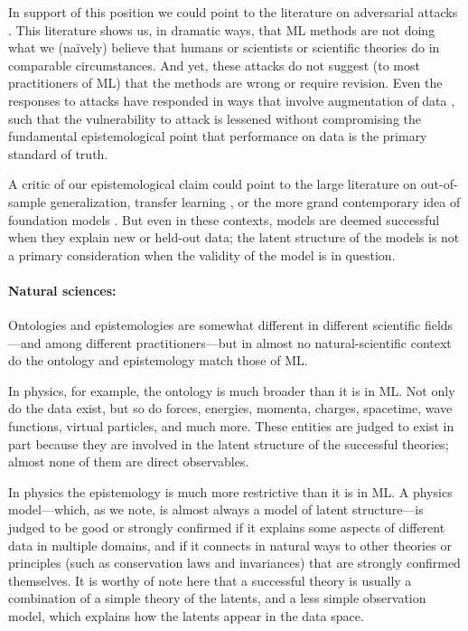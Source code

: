 \documentclass[11pt]{article}
\begin{document}
In support of this position we could point to the literature on adversarial attacks \cite{adversarial1, adversarial2}.
This literature shows us, in dramatic ways, that ML methods are not doing what we (na\"ively) believe that humans or scientists or scientific theories do in comparable circumstances.
And yet, these attacks do not suggest (to most practitioners of ML) that the methods are wrong or require revision.
Even the responses to attacks have responded in ways that involve augmentation of data \cite{adversarial_training}, such that the vulnerability to attack is lessened without compromising the fundamental epistemological point that performance on data is the primary standard of truth.

A critic of our epistemological claim could point to the large literature on out-of-sample generalization, transfer learning \cite{transfer}, or the more grand contemporary idea of foundation models \cite{foundation}.
But even in these contexts, models are deemed successful when they explain new or held-out data; the latent structure of the models is not a primary consideration when the validity of the model is in question.

\paragraph{Natural sciences:}
Ontologies and epistemologies are somewhat different in different scientific fields---and among different practitioners---but in almost no natural-scientific context do the ontology and epistemology match those of ML.

In physics, for example, the ontology is much broader than it is in ML.
Not only do the data exist, but so do forces, energies, momenta, charges, spacetime, wave functions, virtual particles, and much more.
These entities are judged to exist in part because they are involved in the latent structure of the successful theories; almost none of them are direct observables.

In physics the epistemology is much more restrictive than it is in ML.
A physics model---which, as we note, is almost always a model of latent structure---is judged to be good or strongly confirmed if it explains some aspects of different data in multiple domains, and if it connects in natural ways to other theories or principles (such as conservation laws and invariances) that are strongly confirmed themselves.
It is worthy of note here that a successful theory is usually a combination of a simple theory of the latents, and a less simple observation model, which explains how the latents appear in the data space.
\end{document}
